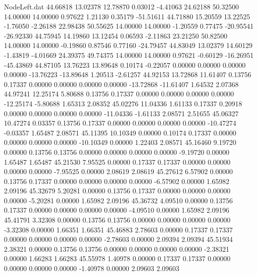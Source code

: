 \begin{filecontents}{NodeLeft.dat}
  44.66818   13.02378   12.78870     0.03012   -4.41063   24.62188   50.32500   14.00000   14.00000    0.97622    1.21130    0.35179  -51.51611
  44.71880   15.20559   13.22525    -1.76050   -2.26188   22.98438   50.55625   14.00000   14.00000   -1.20559    0.77475  -20.95541  -26.92330
  44.75945   14.19860   13.12454     0.06593   -2.11863   23.21250   50.82500   14.00000   14.00000   -0.19860    0.87546    0.77160  -24.79457
  44.83049   13.02379   14.60129    -1.43819   -4.01669   24.39375   49.74375   14.00000   14.00000    0.97621   -0.60129  -16.26951  -45.43869
  44.87105   13.76223   13.89648     0.10174   -0.22057    0.00000    0.00000    0.00000    0.00000  -13.76223  -13.89648    1.20513   -2.61257
  44.92153   13.72868   11.61407     0.13756    0.17337    0.00000    0.00000    0.00000    0.00000  -13.72868  -11.61407    1.64532    2.07368
  44.97241   12.25174    5.80688     0.13756    0.17337    0.00000    0.00000    0.00000    0.00000  -12.25174   -5.80688    1.65313    2.08352
  45.02276   11.04336    1.61133     0.17337    0.20918    0.00000    0.00000    0.00000    0.00000  -11.04336   -1.61133    2.08571    2.51655
  45.06327   10.47274    0.03357     0.13756    0.17337    0.00000    0.00000    0.00000    0.00000  -10.47274   -0.03357    1.65487    2.08571
  45.11395   10.10349    0.00000     0.10174    0.17337    0.00000    0.00000    0.00000    0.00000  -10.10349    0.00000    1.22403    2.08571
  45.16460    9.19720    0.00000     0.13756    0.13756    0.00000    0.00000    0.00000    0.00000   -9.19720    0.00000    1.65487    1.65487
  45.21530    7.95525    0.00000     0.17337    0.17337    0.00000    0.00000    0.00000    0.00000   -7.95525    0.00000    2.08619    2.08619
  45.27612    6.57902    0.00000     0.13756    0.17337    0.00000    0.00000    0.00000    0.00000   -6.57902    0.00000    1.65982    2.09196
  45.32679    5.20281    0.00000     0.13756    0.17337    0.00000    0.00000    0.00000    0.00000   -5.20281    0.00000    1.65982    2.09196
  45.36732    4.09510    0.00000     0.13756    0.17337    0.00000    0.00000    0.00000    0.00000   -4.09510    0.00000    1.65982    2.09196
  45.41791    3.32308    0.00000     0.13756    0.13756    0.00000    0.00000    0.00000    0.00000   -3.32308    0.00000    1.66351    1.66351
  45.46883    2.78603    0.00000     0.17337    0.17337    0.00000    0.00000    0.00000    0.00000   -2.78603    0.00000    2.09394    2.09394
  45.51934    2.38321    0.00000     0.13756    0.13756    0.00000    0.00000    0.00000    0.00000   -2.38321    0.00000    1.66283    1.66283
  45.55978    1.40978    0.00000     0.17337    0.17337    0.00000    0.00000    0.00000    0.00000   -1.40978    0.00000    2.09603    2.09603

\end{filecontents}
